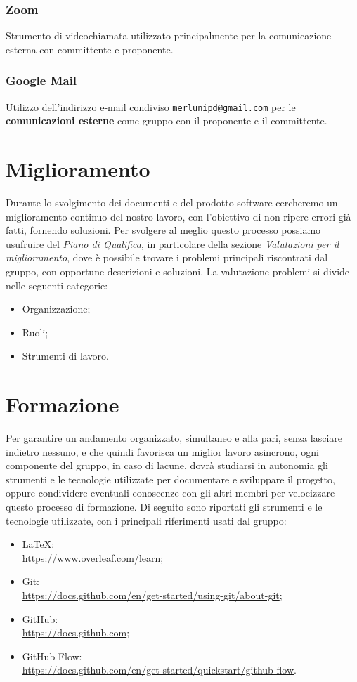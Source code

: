 \subsubsection{Zoom}
Strumento di videochiamata utilizzato principalmente per la comunicazione esterna con committente e proponente.

\subsubsection{Google Mail}
Utilizzo dell'indirizzo e-mail condiviso \texttt{merlunipd@gmail.com} per le \textbf{comunicazioni esterne} come gruppo con il proponente e il committente.

\section{Miglioramento}
Durante lo svolgimento dei documenti e del prodotto software cercheremo un miglioramento continuo del nostro lavoro, con l'obiettivo di non ripere errori già fatti, fornendo soluzioni. Per svolgere al meglio questo processo possiamo usufruire del \textit{Piano di Qualifica}, in particolare della sezione \textit{Valutazioni per il miglioramento}, dove è possibile trovare i problemi principali riscontrati dal gruppo, con opportune descrizioni e soluzioni. La valutazione problemi si divide nelle seguenti categorie:
\begin{itemize}
  \item Organizzazione;
  \item Ruoli;
  \item Strumenti di lavoro.
\end{itemize}

\section{Formazione}
Per garantire un andamento organizzato, simultaneo e alla pari, senza lasciare indietro nessuno, e che quindi favorisca un miglior lavoro
asincrono, ogni componente del gruppo, in caso di lacune, dovrà studiarsi in autonomia gli strumenti e le tecnologie utilizzate per documentare e sviluppare
il progetto, oppure condividere eventuali conoscenze con gli altri membri per velocizzare questo processo di formazione.
\newline
Di seguito sono riportati gli strumenti e le tecnologie utilizzate, con i principali riferimenti usati dal gruppo:
\begin{itemize}
    \item LaTeX:\\ \url{https://www.overleaf.com/learn};
    \item Git:\\ \url{https://docs.github.com/en/get-started/using-git/about-git};
    \item GitHub:\\ \url{https://docs.github.com};
    \item GitHub Flow:\\ \url{https://docs.github.com/en/get-started/quickstart/github-flow}.
\end{itemize}
